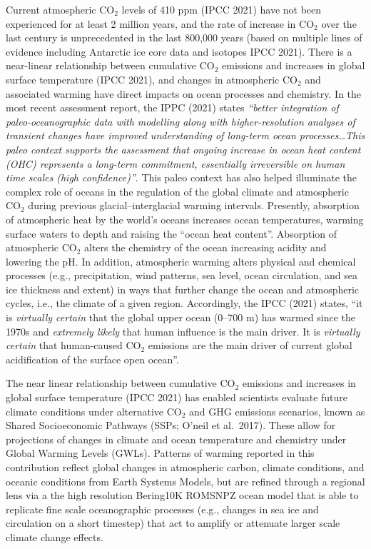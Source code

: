 \documentclass[
]{article}
\begin{document}
Current atmospheric CO\(_2\) levels of 410 ppm (IPCC 2021) have not been
experienced for at least 2 million years, and the rate of increase in
CO\(_2\) over the last century is unprecedented in the last 800,000
years (based on multiple lines of evidence including Antarctic ice core
data and isotopes IPCC 2021). There is a near-linear relationship
between cumulative CO\(_2\) emissions and increases in global surface
temperature (IPCC 2021), and changes in atmospheric CO\(_2\) and
associated warming have direct impacts on ocean processes and chemistry.
In the most recent assessment report, the IPPC (2021) states
\emph{``better integration of paleo-oceanographic data with modelling
along with higher-resolution analyses of transient changes have improved
understanding of long-term ocean processes\ldots This paleo context
supports the assessment that ongoing increase in ocean heat content
(OHC) represents a long-term commitment, essentially irreversible on
human time scales (high confidence)''}. This paleo context has also
helped illuminate the complex role of oceans in the regulation of the
global climate and atmospheric CO\(_2\) during previous
glacial--interglacial warming intervals. Presently, absorption of
atmospheric heat by the world's oceans increases ocean temperatures,
warming surface waters to depth and raising the ``ocean heat content''.
Absorption of atmospheric CO\(_2\) alters the chemistry of the ocean
increasing acidity and lowering the pH. In addition, atmospheric warming
alters physical and chemical processes (e.g., precipitation, wind
patterns, sea level, ocean circulation, and sea ice thickness and
extent) in ways that further change the ocean and atmospheric cycles,
i.e., the climate of a given region. Accordingly, the IPCC (2021)
states, ``it is \emph{virtually certain} that the global upper ocean
(0--700 m) has warmed since the 1970s and \emph{extremely likely} that
human influence is the main driver. It is \emph{virtually certain} that
human-caused CO\(_2\) emissions are the main driver of current global
acidification of the surface open ocean''.

The near linear relationship between cumulative CO\(_2\) emissions and
increases in global surface temperature (IPCC 2021) has enabled
scientists evaluate future climate conditions under alternative CO\(_2\)
and GHG emissions scenarios, known as Shared Socioeconomic Pathways
(SSPs; O'neil et al.~2017). These allow for projections of changes in
climate and ocean temperature and chemistry under Global Warming Levels
(GWLs). Patterns of warming reported in this contribution reflect global
changes in atmospheric carbon, climate conditions, and oceanic
conditions from Earth Systems Models, but are refined through a regional
lens via a the high resolution Bering10K ROMSNPZ ocean model that is
able to replicate fine scale oceanographic processes (e.g., changes in
sea ice and circulation on a short timestep) that act to amplify or
attenuate larger scale climate change effects.
\end{document}
